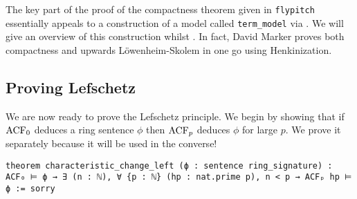 \begin{rmk}
  The key part of the proof of the compactness theorem given in \texttt{flypitch} essentially
  appeals to a construction of a model called
  \texttt{term\_model} via .
  We will give an overview of this construction whilst
  .
  In fact, David Marker \cite{marker} proves both compactness and upwards L\"{o}wenheim-Skolem
  in one go using Henkinization.
\end{rmk}

\subsection{Proving Lefschetz}

We are now ready to prove the Lefschetz principle.
We begin by showing that if $\operatorname{ACF}_{0}$ deduces a ring sentence $\phi$
then $\operatorname{ACF}_{p}$ deduces $\phi$ for large $p$.
We prove it separately because it will be used in the converse!

\begin{lstlisting}
theorem characteristic_change_left (ϕ : sentence ring_signature) :
ACF₀ ⊨ ϕ → ∃ (n : ℕ), ∀ {p : ℕ} (hp : nat.prime p), n < p → ACFₚ hp ⊨ ϕ := sorry \end{lstlisting}

